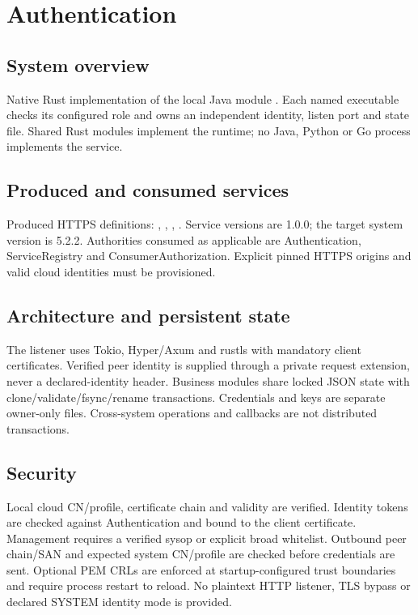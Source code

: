 \documentclass[a4paper]{arrowhead}
\begin{document}
\ArrowheadSetup
\section{Authentication}
\subsection{System overview}
Native Rust implementation of the local Java module . Each named executable checks its configured role and owns an independent identity, listen port and state file. Shared Rust modules implement the runtime; no Java, Python or Go process implements the service.
\subsection{Produced and consumed services}
Produced HTTPS definitions: , \allowbreak {}, \allowbreak {}, \allowbreak {}. Service versions are 1.0.0; the target system version is 5.2.2. Authorities consumed as applicable are Authentication, ServiceRegistry and ConsumerAuthorization. Explicit pinned HTTPS origins and valid cloud identities must be provisioned.
\subsection{Architecture and persistent state}
The listener uses Tokio, Hyper/Axum and rustls with mandatory client certificates. Verified peer identity is supplied through a private request extension, never a declared-identity header. Business modules share locked JSON state with clone/validate/fsync/rename transactions. Credentials and keys are separate owner-only files. Cross-system operations and callbacks are not distributed transactions.
\subsection{Security}
Local cloud CN/profile, certificate chain and validity are verified. Identity tokens are checked against Authentication and bound to the client certificate. Management requires a verified sysop or explicit broad whitelist. Outbound peer chain/SAN and expected system CN/profile are checked before credentials are sent. Optional PEM CRLs are enforced at startup-configured trust boundaries and require process restart to reload. No plaintext HTTP listener, TLS bypass or declared SYSTEM identity mode is provided.
\end{document}
